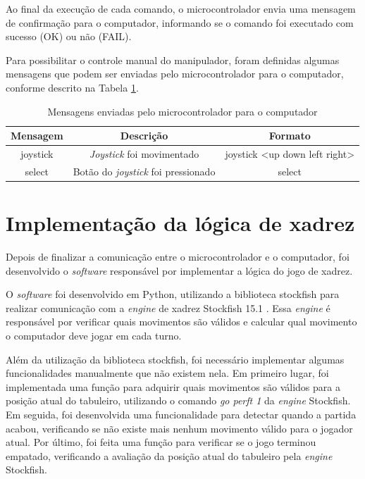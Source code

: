 Ao final da execução de cada comando, o microcontrolador envia uma mensagem de confirmação para o computador, informando se o comando foi executado com sucesso (OK) ou não (FAIL).

Para possibilitar o controle manual do manipulador, foram definidas algumas mensagens que podem ser enviadas pelo microcontrolador para o computador, conforme descrito na Tabela \ref{tab:mensagensMicrocontrolador}.

\begin{table}[H]
    \centering
    \caption{Mensagens enviadas pelo microcontrolador para o computador}
    \begin{tabular}{|c|c|c|}
        \hline
        \textbf{Mensagem} & \textbf{Descrição} & \textbf{Formato} \\
        \hline
        joystick & \textit{Joystick} foi movimentado & joystick <up down left right> \\
        \hline
        select & Botão do \textit{joystick} foi pressionado & select \\
        \hline
    \end{tabular}
    \label{tab:mensagensMicrocontrolador}
\end{table}

\section[Implementação da lógica de xadrez]{Implementação da lógica de xadrez}
\label{sec:implementacaoLogicaXadrez}

Depois de finalizar a comunicação entre o microcontrolador e o computador, foi desenvolvido o \textit{software} responsável por implementar a lógica do jogo de xadrez.

O \textit{software} foi desenvolvido em Python, utilizando a biblioteca stockfish \cite{stockfish_python} para realizar comunicação com a \textit{engine} de xadrez Stockfish 15.1 \cite{stockfish_engine}.
Essa \textit{engine} é responsável por verificar quais movimentos são válidos e calcular qual movimento o computador deve jogar em cada turno.

Além da utilização da biblioteca stockfish, foi necessário implementar algumas funcionalidades manualmente que não existem nela.
Em primeiro lugar, foi implementada uma função para adquirir quais movimentos são válidos para a posição atual do tabuleiro, utilizando o comando \textit{go perft 1} da \textit{engine} Stockfish.
Em seguida, foi desenvolvida uma funcionalidade para detectar quando a partida acabou, verificando se não existe mais nenhum movimento válido para o jogador atual.
Por último, foi feita uma função para verificar se o jogo terminou empatado, verificando a avaliação da posição atual do tabuleiro pela \textit{engine} Stockfish.

